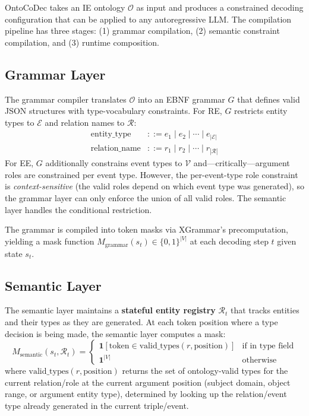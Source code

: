 \documentclass[11pt]{article}
\newcommand{\sys}{OntoCoDec}
\begin{document}
\sys{} takes an IE ontology $\mathcal{O}$ as input and produces a constrained decoding configuration that can be applied to any autoregressive LLM.
The compilation pipeline has three stages: (1) grammar compilation, (2) semantic constraint compilation, and (3) runtime composition.

\subsection{Grammar Layer}
The grammar compiler translates $\mathcal{O}$ into an EBNF grammar $G$ that defines valid JSON structures with type-vocabulary constraints.
For RE, $G$ restricts entity types to $\mathcal{E}$ and relation names to $\mathcal{R}$:
\begin{align}
\text{entity\_type} &::= e_1 \mid e_2 \mid \cdots \mid e_{|\mathcal{E}|} \\
\text{relation\_name} &::= r_1 \mid r_2 \mid \cdots \mid r_{|\mathcal{R}|}
\end{align}
For EE, $G$ additionally constrains event types to $\mathcal{V}$ and---critically---argument roles are constrained per event type.
However, the per-event-type role constraint is \emph{context-sensitive} (the valid roles depend on which event type was generated), so the grammar layer can only enforce the union of all valid roles.
The semantic layer handles the conditional restriction.

The grammar is compiled into token masks via XGrammar's precomputation, yielding a mask function $M_{\text{grammar}}(s_t) \in \{0,1\}^{|V|}$ at each decoding step $t$ given state $s_t$.

\subsection{Semantic Layer}
The semantic layer maintains a \textbf{stateful entity registry} $\mathcal{R}_t$ that tracks entities and their types as they are generated.
At each token position where a type decision is being made, the semantic layer computes a mask:
\begin{equation}
M_{\text{semantic}}(s_t, \mathcal{R}_t) = \begin{cases}
\mathbf{1}[\text{token} \in \text{valid\_types}(r, \text{position})] & \text{if in type field} \\
\mathbf{1}^{|V|} & \text{otherwise}
\end{cases}
\end{equation}
where $\text{valid\_types}(r, \text{position})$ returns the set of ontology-valid types for the current relation/role at the current argument position (subject domain, object range, or argument entity type), determined by looking up the relation/event type already generated in the current triple/event.
\end{document}
